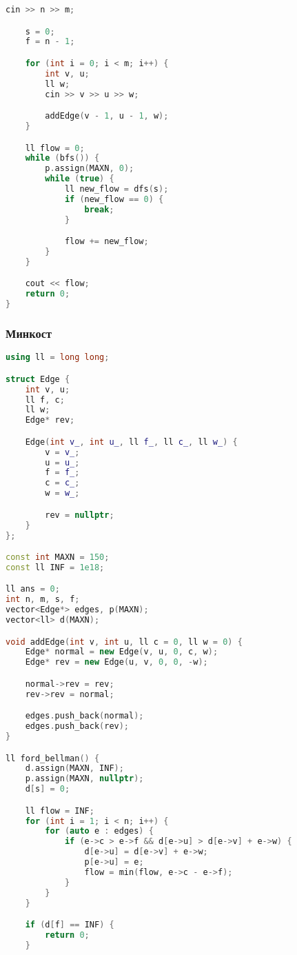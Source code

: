 \documentclass[10pt,a4paper,landscape,twosided]{extarticle}
\begin{document}
\begin{multicols}{3}
\begin{lstlisting}[language=C++]
    cin >> n >> m;

    s = 0;
    f = n - 1;

    for (int i = 0; i < m; i++) {
        int v, u;
        ll w;
        cin >> v >> u >> w;

        addEdge(v - 1, u - 1, w);
    }

    ll flow = 0;
    while (bfs()) {
        p.assign(MAXN, 0);
        while (true) {
            ll new_flow = dfs(s);
            if (new_flow == 0) {
                break;
            }

            flow += new_flow;
        }
    }

    cout << flow;
    return 0;
}


\end{lstlisting}

\subsubsection{Минкост}
\begin{lstlisting}[language=C++]
using ll = long long;

struct Edge {
    int v, u;
    ll f, c;
    ll w;
    Edge* rev;

    Edge(int v_, int u_, ll f_, ll c_, ll w_) {
        v = v_;
        u = u_;
        f = f_;
        c = c_;
        w = w_;

        rev = nullptr;
    }
};

const int MAXN = 150;
const ll INF = 1e18;

ll ans = 0;
int n, m, s, f;
vector<Edge*> edges, p(MAXN);
vector<ll> d(MAXN);

void addEdge(int v, int u, ll c = 0, ll w = 0) {
    Edge* normal = new Edge(v, u, 0, c, w);
    Edge* rev = new Edge(u, v, 0, 0, -w);

    normal->rev = rev;
    rev->rev = normal;

    edges.push_back(normal);
    edges.push_back(rev);
}

ll ford_bellman() {
    d.assign(MAXN, INF);
    p.assign(MAXN, nullptr);
    d[s] = 0;

    ll flow = INF;
    for (int i = 1; i < n; i++) {
        for (auto e : edges) {
            if (e->c > e->f && d[e->u] > d[e->v] + e->w) {
                d[e->u] = d[e->v] + e->w;
                p[e->u] = e;
                flow = min(flow, e->c - e->f);
            }
        }
    }

    if (d[f] == INF) {
        return 0;
    }


\end{lstlisting}
\end{multicols}
\end{document}
